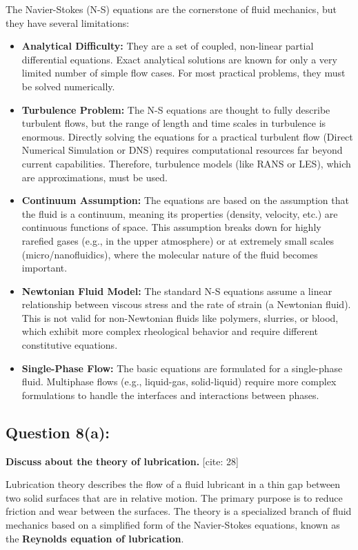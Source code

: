 \documentclass{article}
\begin{document}
The Navier-Stokes (N-S) equations are the cornerstone of fluid mechanics, but they have several limitations:
\begin{itemize}
    \item \textbf{Analytical Difficulty:} They are a set of coupled, non-linear partial differential equations. Exact analytical solutions are known for only a very limited number of simple flow cases. For most practical problems, they must be solved numerically.
    \item \textbf{Turbulence Problem:} The N-S equations are thought to fully describe turbulent flows, but the range of length and time scales in turbulence is enormous. Directly solving the equations for a practical turbulent flow (Direct Numerical Simulation or DNS) requires computational resources far beyond current capabilities. Therefore, turbulence models (like RANS or LES), which are approximations, must be used.
    \item \textbf{Continuum Assumption:} The equations are based on the assumption that the fluid is a continuum, meaning its properties (density, velocity, etc.) are continuous functions of space. This assumption breaks down for highly rarefied gases (e.g., in the upper atmosphere) or at extremely small scales (micro/nanofluidics), where the molecular nature of the fluid becomes important.
    \item \textbf{Newtonian Fluid Model:} The standard N-S equations assume a linear relationship between viscous stress and the rate of strain (a Newtonian fluid). This is not valid for non-Newtonian fluids like polymers, slurries, or blood, which exhibit more complex rheological behavior and require different constitutive equations.
    \item \textbf{Single-Phase Flow:} The basic equations are formulated for a single-phase fluid. Multiphase flows (e.g., liquid-gas, solid-liquid) require more complex formulations to handle the interfaces and interactions between phases.
\end{itemize}
\hrulefill

\subsection*{\textbf{Question 8(a):}}
\textbf{Discuss about the theory of lubrication.} [cite: 28]

Lubrication theory describes the flow of a fluid lubricant in a thin gap between two solid surfaces that are in relative motion. The primary purpose is to reduce friction and wear between the surfaces. The theory is a specialized branch of fluid mechanics based on a simplified form of the Navier-Stokes equations, known as the \textbf{Reynolds equation of lubrication}.
\end{document}
